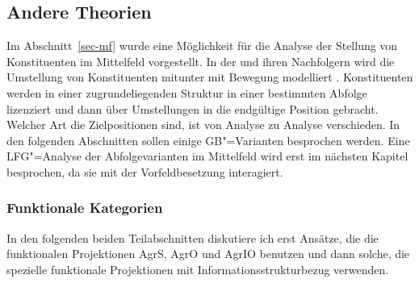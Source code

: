 \begin{exe}
\begin{xlist}


\subsection{Andere Theorien}
\label{sec-alternativen-konstituentenreihenfolge-gb}

Im Abschnitt~\ref{sec-mf} wurde eine Möglichkeit für die Analyse der Stellung von Konstituenten im Mittelfeld vorgestellt.
In der \gbt und ihren Nachfolgern wird die Umstellung von Konstituenten mitunter mit Bewegung
modelliert \parencites[z.\,B.][Abschnitt~12.6]{SS88a}[1306]{Grewendorf95a}.
Konstituenten werden in einer zugrundeliegenden Struktur in einer bestimmten Abfolge lizenziert
und dann über Umstellungen in die endgültige Position gebracht. Welcher Art die Zielpositionen sind,
ist von Analyse zu Analyse verschieden. In den folgenden Abschnitten sollen einige GB"=Varianten
besprochen werden. Eine LFG"=Analyse der Abfolgevarianten im Mittelfeld wird erst im nächsten
Kapitel besprochen, da sie mit der Vorfeldbesetzung interagiert.

\subsubsection{Funktionale Kategorien}

In den folgenden beiden Teilabschnitten diskutiere ich erst Ansätze, die die funktionalen Projektionen
AgrS, AgrO und AgrIO benutzen und dann solche, die spezielle funktionale Projektionen 
mit Informationsstrukturbezug verwenden.
\largerpage


\end{xlist}
\end{exe}
